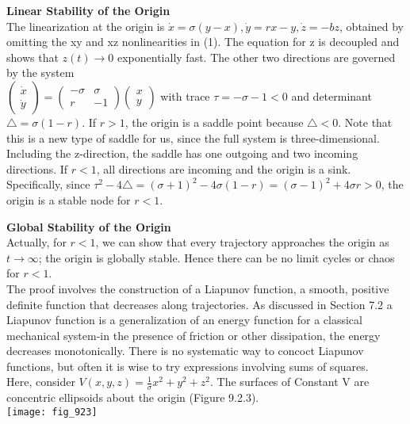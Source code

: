 \documentclass{article}
\newcommand\tab[1][1cm]{\hspace*{#1}}
\begin{document}
\textbf {Linear Stability of the Origin} \\ \tab
The linearization at the origin is $\dot{x}=\sigma(y-x), \dot{y}=rx-y, \dot{z}=-bz$, obtained by omitting the xy and xz nonlinearities in (1). The equation for z is decoupled and shows that $z(t) \to 0$ exponentially fast. The other two directions are governed by the system \\ \tab \tab
${ \begin{pmatrix}
\dot{x}\\
\dot{y}
\end{pmatrix}
=
\begin{pmatrix}
-\sigma & \sigma \\
r & -1
\end{pmatrix}
\begin{pmatrix}
x \\
y
\end{pmatrix}
}$
with trace $\tau = -\sigma - 1 <0$ and determinant $\triangle = \sigma (1-r).$ If $r>1$, the origin is a saddle point because $\triangle < 0$. Note that this is a new type of saddle for us, since the full system is three-dimensional. Including the z-direction, the saddle has one outgoing and two incoming directions. If $r<1$, all directions are incoming and the origin is a sink. Specifically, since $\tau^{2}-4\triangle = (\sigma +1)^{2}-4\sigma (1-r)=(\sigma - 1)^{2}+4\sigma r > 0$, the origin is a stable node for $r<1$.

\textbf {Global Stability of the Origin} \\ \tab
Actually, for $r<1$, we can show that every trajectory approaches the origin as $t \to \infty$; the origin is globally stable. Hence there can be no limit cycles or chaos for $r<1$. \\ \tab
The proof involves the construction of a Liapunov function, a smooth, positive definite function that decreases along trajectories. As discussed in Section 7.2 a Liapunov function is a generalization of an energy function for a classical mechanical system-in the presence of friction or other dissipation, the energy decreases monotonically. There is no systematic way to concoct Liapunov functions, but often it is wise to try expressions involving sums of squares. \\ \tab
Here, consider $V(x,y,z)= \frac{1}{\sigma}x^{2}+y^{2}+z^{2}$. The surfaces of Constant V are concentric ellipsoids about the origin (Figure 9.2.3). \\
\texttt{[image: fig\_923]}
\end{document}
